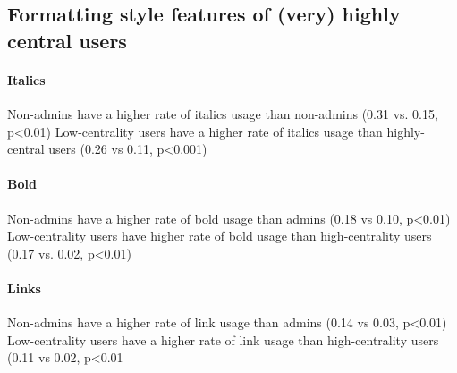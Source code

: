 \documentclass[12pt]{scrartcl}
\begin{document}
\subsection{Formatting style features of (very) highly central users} %
\paragraph{Italics}
Non-admins have a higher rate of italics usage than non-admins (0.31 vs. 0.15, p<0.01)
Low-centrality users have a higher rate of italics usage than highly-central users (0.26 vs 0.11, p<0.001)

\paragraph{Bold}
Non-admins have a higher rate of bold usage than admins (0.18 vs 0.10, p<0.01)
Low-centrality users have higher rate of bold usage than high-centrality users (0.17 vs. 0.02, p<0.01)

\paragraph{Links}
Non-admins have a higher rate of link usage than admins (0.14 vs 0.03, p<0.01)
Low-centrality users have a higher rate of link usage than high-centrality users (0.11 vs 0.02, p<0.01



\end{document}
